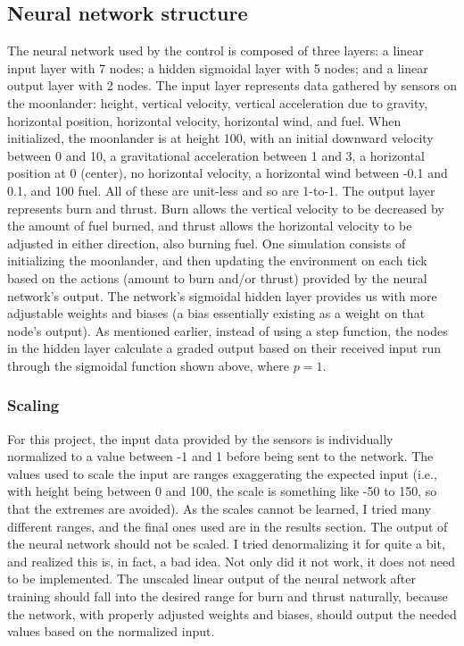 \documentclass[12pt, article]{scrartcl}
\begin{document}
\subsection{Neural network structure}
The neural network used by the control is composed of three layers: a linear input layer with 7 nodes; a hidden sigmoidal layer with 5 nodes; and a linear output layer with 2 nodes. The input layer represents data gathered by sensors on the moonlander: height, vertical velocity, vertical acceleration due to gravity, horizontal position, horizontal velocity, horizontal wind, and fuel. When initialized, the moonlander is at height 100, with an initial downward velocity between 0 and 10, a gravitational acceleration between 1 and 3, a horizontal position at 0 (center), no horizontal velocity, a horizontal wind between -0.1 and 0.1, and 100 fuel. All of these are unit-less and so are 1-to-1. The output layer represents burn and thrust. Burn allows the vertical velocity to be decreased by the amount of fuel burned, and thrust allows the horizontal velocity to be adjusted in either direction, also burning fuel. One simulation consists of initializing the moonlander, and then updating the environment on each tick based on the actions (amount to burn and/or thrust) provided by the neural network's output. The network's sigmoidal hidden layer provides us with more adjustable weights and biases (a bias essentially existing as a weight on that node's output). As mentioned earlier, instead of using a step function, the nodes in the hidden layer calculate a graded output based on their received input run through the sigmoidal function shown above, where $p=1$.

\subsubsection{Scaling}
For this project, the input data provided by the sensors is individually normalized to a value between -1 and 1 before being sent to the network. The values used to scale the input are ranges exaggerating the expected input (i.e., with height being between 0 and 100, the scale is something like -50 to 150, so that the extremes are avoided). As the scales cannot be learned, I tried many different ranges, and the final ones used are in the results section. The output of the neural network should not be scaled. I tried denormalizing it for quite a bit, and realized this is, in fact, a bad idea. Not only did it not work, it does not need to be implemented. The unscaled linear output of the neural network after training should fall into the desired range for burn and thrust naturally, because the network, with properly adjusted weights and biases, should output the needed values based on the normalized input.
\end{document}
